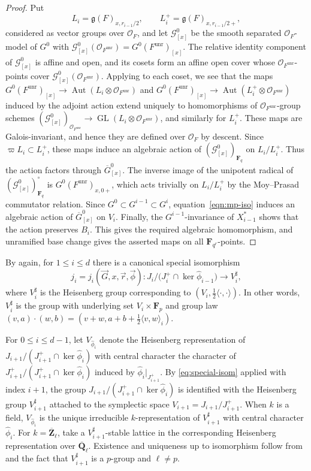 \documentclass[reqno]{amsart}
\numberwithin{equation}{subsection}
\newcommand{\F}{\mathbf{F}}
\newcommand{\Q}{\mathbf{Q}}
\newcommand{\Z}{\mathbf{Z}}
\newcommand{\ol}[1]{\overline{#1}}
\newcommand{\wh}[1]{\widehat{#1}}
\newcommand\cG{\mathcal{G}}
\newcommand\cO{\mathcal{O}}
\newcommand\frg{\mathfrak{g}}
\DeclareMathOperator{\GL}{GL}
\DeclareMathOperator{\Aut}{Aut}
\DeclareMathOperator{\unr}{unr}
\theoremstyle{remark}
\numberwithin{equation}{subsection}
\numberwithin{figure}{subsection}
\begin{document}
\begin{proof}
Put
\[
L_i=\frg(F)_{x,r_{i-1}/2},\qquad
L_i^+=\frg(F)_{x,r_{i-1}/2+},
\]
considered as vector groups over $\cO_F$, and let $\cG^0_{[x]}$ be the smooth separated $\cO_F$-model of $G^0$ with $\cG^0_{[x]}(\cO_{F^{\unr}})=G^0(F^{\unr})_{[x]}$. The relative identity component of $\cG^0_{[x]}$ is affine and open, and its cosets form an affine open cover whose $\cO_{F^{\unr}}$-points cover $\cG^0_{[x]}(\cO_{F^{\unr}})$. Applying \cite[Corollary~2.10.10]{KP} to each coset, we see that the maps $G^0(F^{\unr})_{[x]} \to \Aut(L_i \otimes \cO_{F^{\unr}})$ and $G^0(F^{\unr})_{[x]} \to \Aut(L_i^+ \otimes \cO_{F^{\unr}})$ induced by the adjoint action extend uniquely to homomorphisms of $\cO_{F^{\unr}}$-group schemes $(\cG^0_{[x]})_{\cO_{F^{\unr}}} \to \GL(L_i \otimes \cO_{F^{\unr}})$, and similarly for $L_i^+$. These maps are Galois-invariant, and hence they are defined over $\cO_F$ by descent.
Since $\varpi L_i\subset L_i^+$, these maps induce an algebraic action of $(\cG_{[x]}^0)_{\F_q}$ on $L_i/L_i^+$. Thus the action factors through $\ol G^0_{[x]}$. The inverse image of the unipotent radical of $(\cG^0_{[x]})_{\F_q}^{\circ}$ is $G^0(F^{\unr})_{x,0+}$, which acts trivially on $L_i/L_i^+$ by the Moy--Prasad commutator relation. Since $G^0\subset G^{i-1}\subset G^i$, equation~\eqref{eqn:mp-iso} induces an algebraic action of $\ol G^0_{[x]}$ on $V_i$. Finally, the $G^{i-1}$-invariance of $X_{i-1}^*$ shows that the action preserves $B_i$. This gives the required algebraic homomorphism, and unramified base change gives the asserted maps on all $\F_{q^r}$-points.
\end{proof}

By \cite[Proposition 11.4]{Yu01} again, for $1\leq i\leq d$ there is a canonical special isomorphism
\begin{equation}\label{eq:special-isom}
j_i = j_i(\vec{G},x,\vec{r},\vec{\phi}) \colon J_i/\bigl(J_i^+ \cap \ker \widehat{\phi}_{i-1}\bigr) \to V_i^\sharp,
\end{equation}
where $V_i^\sharp$ is the Heisenberg group corresponding to $(V_i, \frac{1}{2}\langle\cdot, \cdot\rangle)$. In other words, $V_i^\sharp$ is the group with underlying set $V_i \times \F_p$ and group law $(v, a)\cdot(w, b) = (v + w, a + b + \frac{1}{2}\langle v, w\rangle_i)$.

For $0\leq i\leq d-1$, let $V_{\widehat{\phi}_i}$ denote the Heisenberg representation of $J_{i+1}/(J_{i+1}^+ \cap \ker \widehat{\phi}_i)$ with central character the character of $J_{i+1}^+/(J_{i+1}^+ \cap \ker \widehat{\phi}_i)$ induced by $\widehat{\phi}_i|_{J_{i+1}^+}$. By \eqref{eq:special-isom} applied with index $i+1$, the group $J_{i+1}/(J_{i+1}^+ \cap \ker \widehat{\phi}_i)$ is identified with the Heisenberg group $V_{i+1}^\sharp$ attached to the symplectic space $V_{i+1}=J_{i+1}/J_{i+1}^+$. When $k$ is a field, $V_{\widehat{\phi}_i}$ is the unique irreducible $k$-representation of $V_{i+1}^\sharp$ with central character $\wh\phi_i$. For $k=\ol\Z_\ell$, take a $V_{i+1}^\sharp$-stable lattice in the corresponding Heisenberg representation over $\ol\Q_\ell$. Existence and uniqueness up to isomorphism follow from \cite[Part III, no.\ 15.5, Proposition 43]{Serre77} and the fact that $V_{i+1}^\sharp$ is a $p$-group and $\ell \neq p$.
\end{document}
